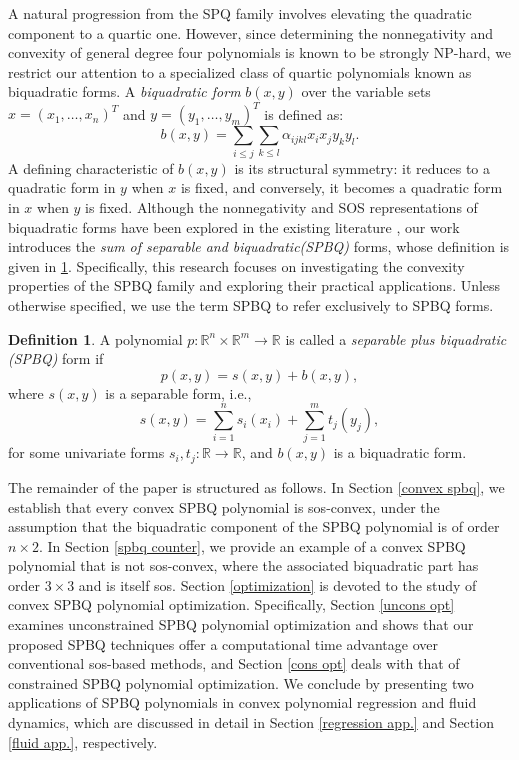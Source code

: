 \documentclass[12pt]{elsarticle}
\theoremstyle{definition}
\newtheorem{definition}{Definition}
\begin{document}
A natural progression from the SPQ family involves elevating the quadratic component to a quartic one. However, since determining the nonnegativity and convexity of general degree four polynomials is known to be strongly NP-hard, we restrict our attention to a specialized class of quartic polynomials known as biquadratic forms. A \textit{biquadratic form} $b(x, y)$ over the variable sets $x = (x_1, \dots, x_n)^{T}$ and $y = (y_1, \dots, y_m)^{T}$ is defined as:
\begin{equation}
b(x, y) = \sum_{i \le j} \sum_{k \le l} \alpha_{ijkl} x_i x_j y_k y_l.
\end{equation}
A defining characteristic of $b(x, y)$ is its structural symmetry: it reduces to a quadratic form in $y$ when $x$ is fixed, and conversely, it becomes a quadratic form in $x$ when $y$ is fixed. Although the nonnegativity and SOS representations of biquadratic forms have been explored in the existing literature \cite{calderon1973note, choi1975positive, el2011class}, our work introduces the \textit{sum of separable and biquadratic(SPBQ)} forms, whose definition is given in \ref{def:SPBQ}. Specifically, this research focuses on investigating the convexity properties of the SPBQ family and exploring their practical applications. Unless otherwise specified, we use the term SPBQ to refer exclusively to SPBQ forms.

\begin{definition}\label{def:SPBQ}
A polynomial 
$p : \mathbb{R}^n \times \mathbb{R}^m \rightarrow \mathbb{R}$ 
is called a \emph{separable plus biquadratic (SPBQ)} form if
\[
p(x, y) = s(x, y) + b(x, y),
\]
where $s(x, y)$ is a separable form, i.e.,
\[
s(x, y) = \sum_{i=1}^n s_i(x_i) + \sum_{j=1}^m t_j(y_j),
\]
for some univariate forms
$s_i, t_j : \mathbb{R} \rightarrow \mathbb{R}$, 
and $b(x, y)$ is a biquadratic form.
\end{definition}


The remainder of the paper is structured as follows. In Section \ref{convex spbq}, we establish that every convex SPBQ polynomial is sos-convex, under the assumption that the biquadratic component of the SPBQ polynomial is of order $n\times 2$. In Section \ref{spbq counter}, we provide an example of a convex SPBQ polynomial that is not sos-convex, where the associated biquadratic part has order $3\times 3$ and is itself sos. Section \ref{optimization} is devoted to the study of convex SPBQ polynomial optimization. Specifically, Section \ref{uncons opt} examines unconstrained SPBQ polynomial optimization and shows that our proposed SPBQ techniques offer a computational time advantage over conventional sos-based methods, and Section \ref{cons opt} deals with that of constrained SPBQ polynomial optimization. We conclude by presenting two applications of SPBQ polynomials in convex polynomial regression and fluid dynamics, which are discussed in detail in Section \ref{regression app.} and Section \ref{fluid app.}, respectively.
\end{document}

